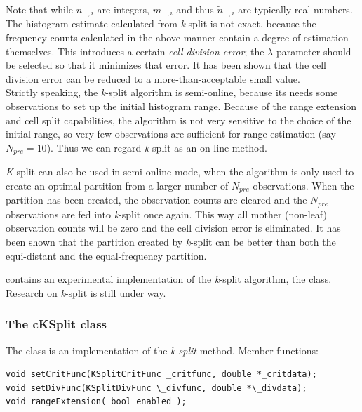 
Note that while $n_{...,i}$ are integers, $m_{...,i}$ and thus
$\tilde{n}_{...,i}$ are typically real numbers. The histogram estimate
calculated from \textit{k}-split is not exact, because the frequency
counts calculated in the above manner contain a degree of estimation
themselves. This introduces a certain \textit{cell division error};
the $\lambda$ parameter should be selected so that it minimizes that
error. It has been shown that the cell division error can
be reduced to a more-than-acceptable small value.\\
Strictly speaking, the \textit{k}-split algorithm is semi-online,
because its needs some observations to set up the initial histogram
range.  Because of the range extension and cell split
capabilities, the algorithm is not very sensitive to the choice of the
initial range, so very few observations are sufficient for range
estimation (say $N_{pre}=10$). Thus we can regard \textit{k}-split as
an on-line method.

\textit{K}-split can also be used in semi-online mode, when the
algorithm is only used to create an optimal partition from a larger
number of $N_{pre}$ observations. When the partition has been created,
the observation counts are cleared and the $N_{pre}$ observations are
fed into \textit{k}-split once again. This way all mother (non-leaf)
observation counts will be zero and the cell division error is
eliminated. It has been shown that the partition created by
\textit{k}-split can be better than both the equi-distant and the
equal-frequency partition.


{\opp} contains an experimental implementation of the \textit{k}-split
algorithm, the  class. Research on \textit{k}-split is
still under way.


\subsubsection{The cKSplit class}

The  class is an implementation of the \textit{k-split} method.
Member functions:

%
%

\begin{verbatim}
void setCritFunc(KSplitCritFunc _critfunc, double *_critdata);
void setDivFunc(KSplitDivFunc \_divfunc, double *\_divdata);
void rangeExtension( bool enabled );
\end{verbatim}


